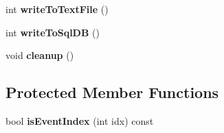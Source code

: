 \begin{DoxyCompactItemize}
\item 
\hypertarget{classps_1_1utils_1_1ProfileSession_ac6efb79d519238380d5b6a24ae0f1b65}{}int {\bfseries write\+To\+Text\+File} ()\label{classps_1_1utils_1_1ProfileSession_ac6efb79d519238380d5b6a24ae0f1b65}

\item 
\hypertarget{classps_1_1utils_1_1ProfileSession_a40e47290574887e14bc99d1f4196db92}{}int {\bfseries write\+To\+Sql\+D\+B} ()\label{classps_1_1utils_1_1ProfileSession_a40e47290574887e14bc99d1f4196db92}

\item 
\hypertarget{classps_1_1utils_1_1ProfileSession_a0c629c5a3dc3699bf25eeba53a5644a4}{}void {\bfseries cleanup} ()\label{classps_1_1utils_1_1ProfileSession_a0c629c5a3dc3699bf25eeba53a5644a4}

\end{DoxyCompactItemize}
\subsection*{Protected Member Functions}
\begin{DoxyCompactItemize}
\item 
\hypertarget{classps_1_1utils_1_1ProfileSession_ae5822d65627207d8116e30f378cd8ca2}{}bool {\bfseries is\+Event\+Index} (int idx) const \label{classps_1_1utils_1_1ProfileSession_ae5822d65627207d8116e30f378cd8ca2}

\end{DoxyCompactItemize}
